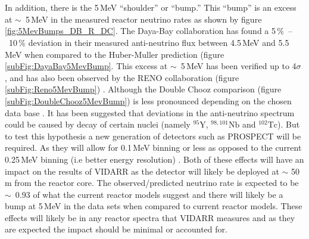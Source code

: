 \\\\In addition, there is the 5\,MeV ``shoulder'' or ``bump.'' This ``bump'' is an excess at $\sim$~5\,MeV in the measured reactor neutrino rates as shown by figure \ref{fig:5MevBumps_DB_R_DC}. The Daya-Bay collaboration has found a 5\,\%~--~10\,\% deviation in their measured anti-neutrino flux between 4.5\,MeV and 5.5\,MeV when compared to the Huber-Muller prediction (figure \ref{subFig:DayaBay5MevBump}. This excess at $\sim$~5\,MeV has been verified up to 4$\sigma$ \cite{dayaBay2016_anFlux}, and has also been observed by the RENO collaboration (figure \ref{subFig:Reno5MevBump}) \cite{Hayes_implicationsShoulder_2015} \cite{dayaBay2016_anFlux} \cite{reno_recentResults_2014}. Although the Double Chooz comparison (figure \ref{subFig:DoubleChooz5MevBump}) is less pronounced depending on the chosen data base \cite{Hayes_implicationsShoulder_2015}. It has been suggested that deviations in the anti-neutrino spectrum could be caused by decay of certain nuclei (namely $^{95}\textrm{Y}$, $^{98,101}\textrm{Nb}$ and $^{102}\textrm{Tc}$). But to test this hypothesis a new generation of detectors such as PROSPECT \cite{Ashenfelter_PROSPECT_2016} will be required. As they will allow for 0.1\,MeV binning or less as opposed to the current 0.25\,MeV binning (i.e better energy resolution) \cite{AaSonzogni_fineAnSpectra_2017}. Both of these effects will have an impact on the results of VIDARR as the detector will likely be deployed at $\sim$ 50\,m from the reactor core. The observed/predicted neutrino rate is expected to be $\sim$~0.93 of what the current reactor models suggest and there will likely be a bump at 5\,MeV in the data sets when compared to current reactor models. These effects will likely be in any reactor spectra that VIDARR measures and as they are expected the impact should be minimal or accounted for.

